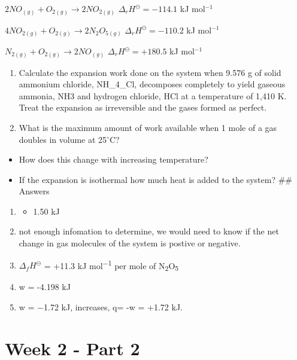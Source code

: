 \documentclass[
]{book}
\providecommand{\tightlist}{%
  \setlength{\itemsep}{0pt}\setlength{\parskip}{0pt}}
\begin{document}
\(2 NO_{(g)} + O_{2(g)} \longrightarrow 2 NO_{2(g)}\) \(\Delta _r H^\ominus = -114.1\) kJ mol\(^{-1}\)

\(4 NO_{2(g)} + O_{2(g)} \longrightarrow 2 N_2 O_{5(g)}\) \(\Delta _r H^\ominus = -110.2\) kJ mol\(^{-1}\)

\(N_{2(g)} + O_{2(g)} \longrightarrow 2 NO_{(g)}\) \(\Delta _r H^\ominus = +180.5\) kJ mol\(^{-1}\)

\begin{enumerate}
\def\labelenumi{\arabic{enumi}.}
\setcounter{enumi}{3}
\item
  Calculate the expansion work done on the system when 9.576 g of solid ammonium chloride, NH\_4\_Cl, decomposes completely to yield gaseous ammonia, NH3 and hydrogen chloride, HCl at a temperature of 1,410 K. Treat the expansion as irreversible and the gases formed as perfect.
\item
  What is the maximum amount of work available when 1 mole of a gas doubles in volume at 25\(^\circ\)C?
\end{enumerate}

\begin{itemize}
\tightlist
\item
  How does this change with increasing temperature?
\item
  If the expansion is isothermal how much heat is added to the system?
  \#\# Answers
\end{itemize}

\begin{enumerate}
\def\labelenumi{\arabic{enumi}.}
\item
  \begin{itemize}
  \tightlist
  \item
    1.50 kJ
  \end{itemize}
\item
  not enough infomation to determine, we would need to know if the net change in gas molecules of the system is postive or negative.
\item
  \(Δ_fH^\ominus\) = +11.3 kJ mol\textsuperscript{−1} per mole of N\textsubscript{2}O\textsubscript{5}
\item
  w = -4.198 kJ
\item
  w = −1.72 kJ, increases, q= -w = +1.72 kJ.
\end{enumerate}

\hypertarget{ch:Part4}{%
\chapter{Week 2 - Part 2}\label{ch:Part4}}
\end{document}
